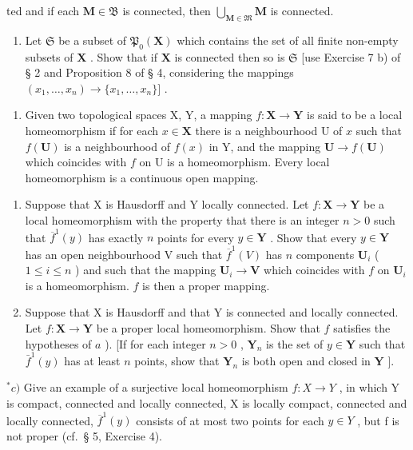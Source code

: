 ted and if each \(\mathbf{M} \in \mathfrak{B}\) is connected, then \(\bigcup_{\mathbf{M} \in \mathfrak{M}} \mathbf{M}\) is connected.

\begin{enumerate}
\def\labelenumi{\alph{enumi})}
\setcounter{enumi}{1}
\tightlist
\item
  Let \(\mathfrak{S}\) be a subset of \(\mathfrak{P}_{0}(\mathbf{X})\) which contains the set of all finite non-empty subsets of \(\mathbf{X}\) . Show that if \(\mathbf{X}\) is connected then so is \(\mathfrak{S}\) {[}use Exercise 7 b) of § 2 and Proposition 8 of § 4, considering the mappings \((x_{1},\ldots ,x_{n})\to \{x_{1},\ldots ,x_{n}\} ]\) .
\end{enumerate}

\begin{enumerate}
\def\labelenumi{\arabic{enumi})}
\setcounter{enumi}{24}
\tightlist
\item
  Given two topological spaces X, Y, a mapping \(f: \mathbf{X} \to \mathbf{Y}\) is said to be a local homeomorphism if for each \(x \in \mathbf{X}\) there is a neighbourhood U of \(x\) such that \(f(\mathbf{U})\) is a neighbourhood of \(f(x)\) in Y, and the mapping \(\mathbf{U} \to f(\mathbf{U})\) which coincides with \(f\) on U is a homeomorphism. Every local homeomorphism is a continuous open mapping.
\end{enumerate}

\begin{enumerate}
\def\labelenumi{\alph{enumi})}
\item
  Suppose that X is Hausdorff and Y locally connected. Let \(f: \mathbf{X} \to \mathbf{Y}\) be a local homeomorphism with the property that there is an integer \(n > 0\) such that \(\overline{f}^1(y)\) has exactly \(n\) points for every \(y \in \mathbf{Y}\) . Show that every \(y \in \mathbf{Y}\) has an open neighbourhood V such that \(\overline{f}^1(V)\) has \(n\) components \(\mathbf{U}_i\) ( \(1 \leqslant i \leqslant n\) ) and such that the mapping \(\mathbf{U}_i \to \mathbf{V}\) which coincides with \(f\) on \(\mathbf{U}_i\) is a homeomorphism. \(f\) is then a proper mapping.
\item
  Suppose that X is Hausdorff and that Y is connected and locally connected. Let \(f: \mathbf{X} \to \mathbf{Y}\) be a proper local homeomorphism. Show that \(f\) satisfies the hypotheses of \(a\) ). {[}If for each integer \(n > 0\) , \(\mathbf{Y}_n\) is the set of \(y \in \mathbf{Y}\) such that \(\bar{f}^1(y)\) has at least \(n\) points, show that \(\mathbf{Y}_n\) is both open and closed in \(\mathbf{Y}\) {]}.
\end{enumerate}

\(^{*}c)\) Give an example of a surjective local homeomorphism \(f: X \to Y\) , in which Y is compact, connected and locally connected, X is locally compact, connected and locally connected, \(\overline{f}^{1}(y)\) consists of at most two points for each \(y \in Y\) , but f is not proper (cf.~§ 5, Exercise 4).
